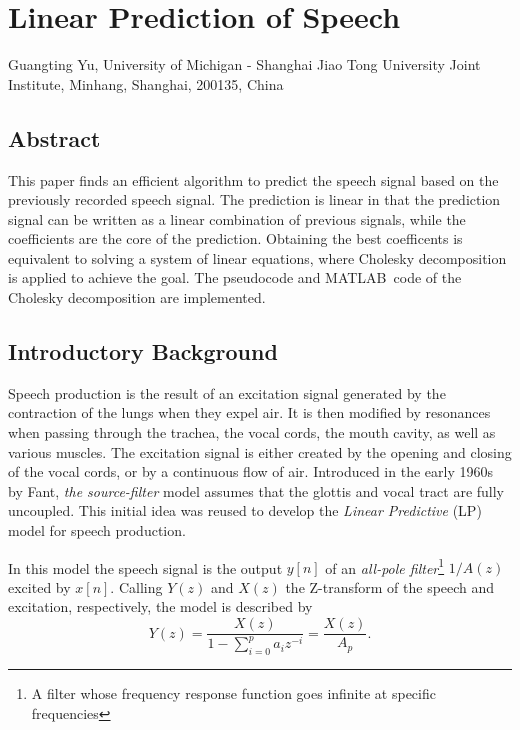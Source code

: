 \titleformat{\section}{\normalfont\large\bfseries}{\thesection}{1em}{}
\renewcommand{\chaptername}{Project}
\renewcommand{\thesection}{\arabic{section}}


\chapter{Linear Prediction of Speech}
\begin{center}
Guangting Yu, University of Michigan - Shanghai Jiao Tong University Joint Institute, Minhang, Shanghai, 200135, China
\end{center}


\section*{Abstract}
This paper finds an efficient algorithm to predict the speech signal based on the previously recorded speech signal.
The prediction is linear in that the prediction signal can be written as a linear combination of previous signals, while the coefficients are the core of the prediction.
Obtaining the best coefficents is equivalent to solving a system of linear equations, where Cholesky decomposition is applied to achieve the goal.
The pseudocode and MATLAB\texttrademark\ code of the Cholesky decomposition are implemented.


\section{Introductory Background}
Speech production is the result of an excitation signal generated by the contraction of the lungs when they expel air.
It is then modified by resonances when passing through the trachea, the vocal cords, the mouth cavity, as well as various muscles.
The excitation signal is either created by the opening and closing of the vocal cords, or by a continuous flow of air.
Introduced in the early 1960s by Fant, \textit{the source-filter} model assumes that the glottis and vocal tract are fully uncoupled.
This initial idea was reused to develop the \textit{Linear Predictive} (LP) model for speech production.\cite{dutoit}

In this model the speech signal is the output \(y[n]\) of an \textit{all-pole filter}\footnote{A filter whose frequency response function goes infinite at specific frequencies} \(1/A(z)\) excited by \(x[n]\).
Calling \(Y(z)\) and \(X(z)\) the Z-transform of the speech and excitation, respectively, the model is described by
\begin{equation}
Y(z)=\frac{X(z)}{1-\sum_{i=0}^p a_i z^{-i}}=\frac{X(z)}{A_p}.
\end{equation}

